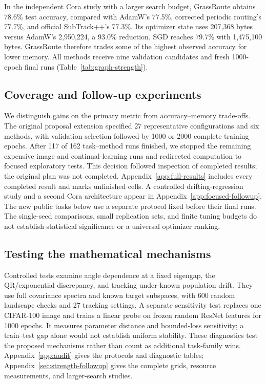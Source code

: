 In the independent Cora study with a larger search budget, GrassRoute obtains
78.6\% test accuracy, compared with AdamW's 77.5\%, corrected periodic
routing's 77.7\%, and official SubTrack++'s 77.3\%. Its optimizer state uses
207,368 bytes versus AdamW's 2,950,224, a 93.0\% reduction. SGD reaches
79.7\% with 1,475,100 bytes. GrassRoute therefore trades some of the highest
observed accuracy for lower memory. All methods receive nine validation
candidates and fresh 1000-epoch final runs (Table~\ref{tab:graph-strength}).






\subsection{Coverage and follow-up experiments}
We distinguish gains on the primary metric from accuracy--memory trade-offs.
The original proposal extension specified 27 representative configurations
and six methods, with validation selection followed by 1000 or 2000 complete
training epochs. After 117 of 162 task--method runs finished, we stopped the
remaining expensive image and continual-learning runs and redirected
computation to focused exploratory tests. This decision followed inspection
of completed results; the original plan was not completed.
Appendix~\ref{app:full-results} includes every completed result and marks
unfinished cells. A controlled drifting-regression study and a second Cora
architecture appear in Appendix~\ref{app:focused-followup}. The new public
tasks below use a separate protocol fixed before their final runs. The
single-seed comparisons, small replication sets, and finite tuning budgets
do not establish statistical significance or a universal optimizer ranking.

\subsection{Testing the mathematical mechanisms}
Controlled tests examine angle dependence at a fixed eigengap, the
QR/exponential discrepancy, and tracking under known population drift. They
use full covariance spectra and known target subspaces, with 600 random
landscape checks and 27 tracking settings. A separate sensitivity test
replaces one CIFAR-100 image and trains a linear probe on frozen random
ResNet features for 1000 epochs. It measures parameter distance and
bounded-loss sensitivity; a train--test gap alone would not establish
uniform stability. These diagnostics test the proposed mechanisms rather
than count as additional task-family wins. Appendix~\ref{app:audit} gives
the protocols and diagnostic tables; Appendix~\ref{sec:strength-followup}
gives the complete grids, resource measurements, and larger-search studies.
